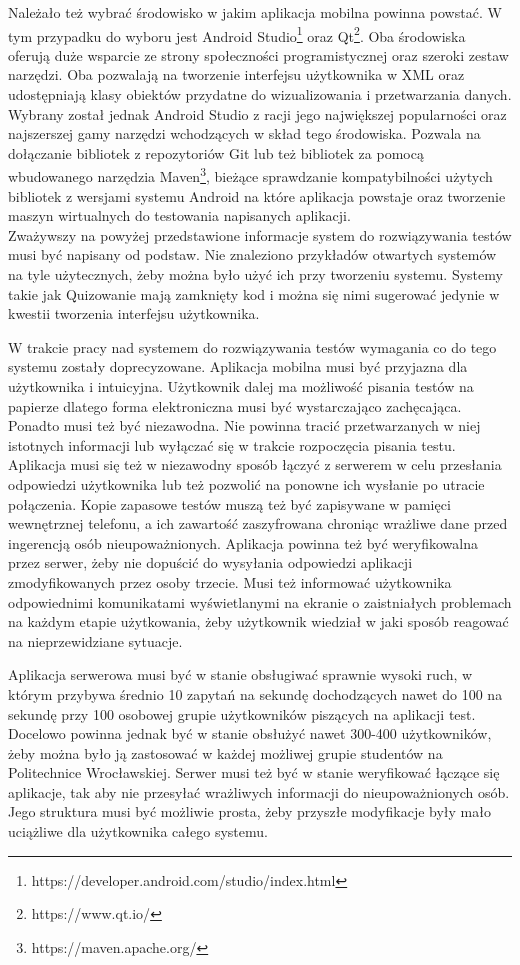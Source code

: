 \documentclass{report}
\begin{document}
	
	Należało też wybrać środowisko w jakim aplikacja mobilna powinna powstać. W tym przypadku do wyboru jest Android Studio\footnote{https://developer.android.com/studio/index.html} oraz Qt\footnote{https://www.qt.io/}. Oba środowiska oferują duże wsparcie ze strony społeczności programistycznej oraz szeroki zestaw narzędzi. Oba pozwalają na tworzenie interfejsu użytkownika w XML oraz udostępniają klasy obiektów przydatne do wizualizowania i przetwarzania danych. Wybrany został jednak Android Studio z racji jego największej popularności oraz najszerszej gamy narzędzi wchodzących w skład tego środowiska. Pozwala na dołączanie bibliotek z repozytoriów Git lub też bibliotek za pomocą wbudowanego narzędzia Maven\footnote{https://maven.apache.org/}, bieżące sprawdzanie kompatybilności użytych bibliotek z wersjami systemu Android na które aplikacja powstaje oraz tworzenie maszyn wirtualnych do testowania napisanych aplikacji.
	\\
	Zważywszy na powyżej przedstawione informacje system do rozwiązywania testów musi być napisany od podstaw. Nie znaleziono przykładów otwartych systemów na tyle użytecznych, żeby można było użyć ich przy tworzeniu systemu. Systemy takie jak Quizowanie mają zamknięty kod i można się nimi sugerować jedynie w kwestii tworzenia interfejsu użytkownika.
	
	W trakcie pracy nad systemem do rozwiązywania testów wymagania co do tego systemu zostały doprecyzowane. Aplikacja mobilna musi być przyjazna dla użytkownika i intuicyjna. Użytkownik dalej ma możliwość pisania testów na papierze dlatego forma elektroniczna musi być wystarczająco zachęcająca. Ponadto musi też być niezawodna. Nie powinna tracić przetwarzanych w niej istotnych informacji lub wyłączać się w trakcie rozpoczęcia pisania testu. Aplikacja musi się też w niezawodny sposób łączyć z serwerem w celu przesłania odpowiedzi użytkownika lub też pozwolić na ponowne ich wysłanie po utracie połączenia. Kopie zapasowe testów muszą też być zapisywane w pamięci wewnętrznej telefonu, a ich zawartość zaszyfrowana chroniąc wrażliwe dane przed ingerencją osób nieupoważnionych. Aplikacja powinna też być weryfikowalna przez serwer, żeby nie dopuścić do wysyłania odpowiedzi aplikacji zmodyfikowanych przez osoby trzecie. Musi też informować użytkownika odpowiednimi komunikatami wyświetlanymi na ekranie o zaistniałych problemach na każdym etapie użytkowania, żeby użytkownik wiedział w jaki sposób reagować na nieprzewidziane sytuacje.
	
	Aplikacja serwerowa musi być w stanie obsługiwać sprawnie wysoki ruch, w którym przybywa średnio 10 zapytań na sekundę dochodzących nawet do 100 na sekundę przy 100 osobowej grupie użytkowników piszących na aplikacji test. Docelowo powinna jednak być w stanie obsłużyć nawet 300-400 użytkowników, żeby można było ją zastosować w każdej możliwej grupie studentów na Politechnice Wrocławskiej. Serwer musi też być w stanie weryfikować łączące się aplikacje, tak aby nie przesyłać wrażliwych informacji do nieupoważnionych osób. Jego struktura musi być możliwie prosta, żeby przyszłe modyfikacje były mało uciążliwe dla użytkownika całego systemu.
	\\
	
\end{document}
